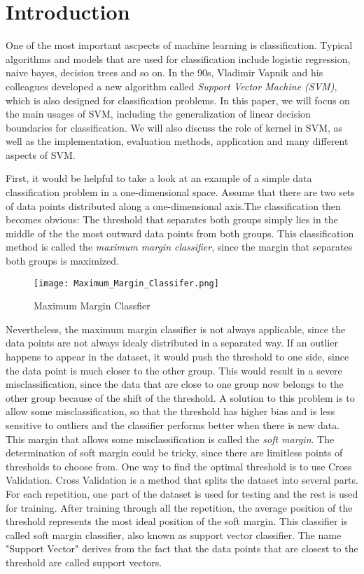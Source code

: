 
\section{Introduction}
One of the most important ascpects of machine learning is classification. Typical algorithms and models
that are used for classification include logistic regression, naive bayes, decision trees and so on. In the 90s, 
Vladimir Vapnik and his colleagues developed a new algorithm called \emph{Support Vector Machine (SVM)}, 
which is also designed for classification problems. In this paper,
we will focus on the main usages of SVM, including the generalization of linear decision boundaries for classification.
We will also discuss the role of kernel in SVM, as well as the implementation, evaluation methods, application and many
different aspects of SVM.


First, it would be helpful to take a look at an example of a simple data classification problem
in a one-dimensional space.
Assume that there are two sets of data points distributed along a one-dimensional axis.The classification then
becomes obvious: The threshold that separates both groups simply lies in the middle of the the most outward data points
from both groups. This classification method is called the \emph{maximum margin classifier}, since the margin that separates both
groups is maximized.

\begin{figure}[h]%
    \begin{center}%
        \texttt{[image: Maximum\_Margin\_Classifer.png]}%
        \caption{Maximum Margin Classfier}\label{fig:}%
    \end{center}%
\end{figure}

Nevertheless, the maximum margin classifier is not always applicable, since the data points are not always idealy distributed
in a separated way. If an outlier happens to appear in the dataset, it would push the threshold to one side, since the data point
is much closer to the other group. This would result in a severe misclassification, since the data that are close to one
group now belongs to the other group because of the shift of the threshold. A solution to this problem is to allow some
misclassification, so that the threshold has higher bias and is less sensitive to outliers and the classifier performs better
when there is new data. This margin that allows some misclassification is called the \emph{soft margin}. The determination of soft margin 
could be tricky, since there are limitless points of thresholds to choose from. One way to find the optimal threshold
is to use Cross Validation. Cross Validation is a method that splits the dataset into several parts. For each repetition, 
one part of the dataset is used for testing and the rest is used for training. After training through all the repetition, the 
average position of the threshold represents the most ideal position of the soft margin. This classifier is called
soft margin classifier, also known as support vector classifier. The name "Support Vector" derives from the fact that
the data points that are closest to the threshold are called support vectors.

